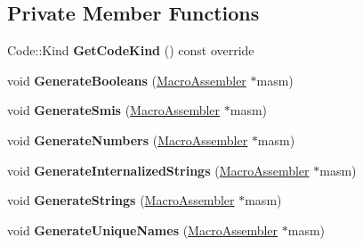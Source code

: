 \subsection*{Private Member Functions}
\begin{DoxyCompactItemize}
\item 
Code\+::\+Kind {\bfseries Get\+Code\+Kind} () const  override\hypertarget{classv8_1_1internal_1_1_compare_i_c_stub_a93fbdfb51eabffee4d682778971273f3}{}\label{classv8_1_1internal_1_1_compare_i_c_stub_a93fbdfb51eabffee4d682778971273f3}

\item 
void {\bfseries Generate\+Booleans} (\hyperlink{classv8_1_1internal_1_1_macro_assembler}{Macro\+Assembler} $\ast$masm)\hypertarget{classv8_1_1internal_1_1_compare_i_c_stub_aecbd42fb89263e32ee81a450bbace542}{}\label{classv8_1_1internal_1_1_compare_i_c_stub_aecbd42fb89263e32ee81a450bbace542}

\item 
void {\bfseries Generate\+Smis} (\hyperlink{classv8_1_1internal_1_1_macro_assembler}{Macro\+Assembler} $\ast$masm)\hypertarget{classv8_1_1internal_1_1_compare_i_c_stub_afa8a2993e079e348ec3552082249bdb0}{}\label{classv8_1_1internal_1_1_compare_i_c_stub_afa8a2993e079e348ec3552082249bdb0}

\item 
void {\bfseries Generate\+Numbers} (\hyperlink{classv8_1_1internal_1_1_macro_assembler}{Macro\+Assembler} $\ast$masm)\hypertarget{classv8_1_1internal_1_1_compare_i_c_stub_ad999b58a69c6d03a27f252a306175046}{}\label{classv8_1_1internal_1_1_compare_i_c_stub_ad999b58a69c6d03a27f252a306175046}

\item 
void {\bfseries Generate\+Internalized\+Strings} (\hyperlink{classv8_1_1internal_1_1_macro_assembler}{Macro\+Assembler} $\ast$masm)\hypertarget{classv8_1_1internal_1_1_compare_i_c_stub_a5970c75f198adb8dc8ae92f09d4f553b}{}\label{classv8_1_1internal_1_1_compare_i_c_stub_a5970c75f198adb8dc8ae92f09d4f553b}

\item 
void {\bfseries Generate\+Strings} (\hyperlink{classv8_1_1internal_1_1_macro_assembler}{Macro\+Assembler} $\ast$masm)\hypertarget{classv8_1_1internal_1_1_compare_i_c_stub_a5c7a2ca30fc1ccae7293bd803d9d51f8}{}\label{classv8_1_1internal_1_1_compare_i_c_stub_a5c7a2ca30fc1ccae7293bd803d9d51f8}

\item 
void {\bfseries Generate\+Unique\+Names} (\hyperlink{classv8_1_1internal_1_1_macro_assembler}{Macro\+Assembler} $\ast$masm)\hypertarget{classv8_1_1internal_1_1_compare_i_c_stub_aef123ae0d5427fe2b2fdd9500fee0865}{}\label{classv8_1_1internal_1_1_compare_i_c_stub_aef123ae0d5427fe2b2fdd9500fee0865}


\end{DoxyCompactItemize}
